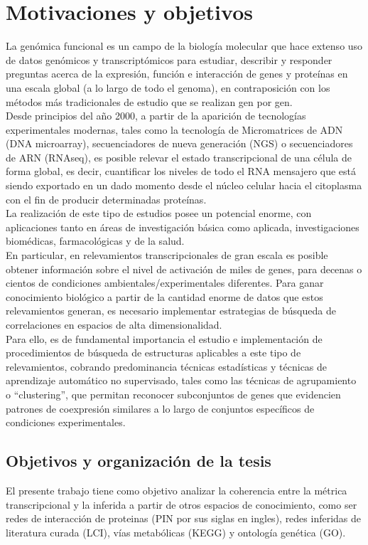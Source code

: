 \chapter*{Motivaciones y objetivos}
La genómica funcional es un campo de la biología molecular que hace extenso uso de datos genómicos y transcriptómicos para estudiar, describir y responder preguntas acerca de la expresión, función e interacción de genes y proteínas en una escala global (a lo largo de todo el genoma), en contraposición con los métodos más tradicionales de estudio que se realizan gen por gen.\\
Desde principios del año 2000, a partir de la aparición de tecnologías experimentales modernas, tales como la tecnología de Micromatrices de ADN (DNA microarray), secuenciadores de nueva generación (NGS) o secuenciadores de ARN (RNAseq), es posible relevar el estado transcripcional de una célula de forma global, es decir, cuantificar los niveles de todo el RNA mensajero que está siendo exportado en un dado momento desde el núcleo celular hacia el citoplasma con el fin de producir determinadas proteínas.\\
La realización de este tipo de estudios posee un potencial enorme, con aplicaciones tanto en áreas de investigación básica como aplicada, investigaciones biomédicas, farmacológicas y de la salud.\\
En particular, en relevamientos transcripcionales de gran escala es posible obtener información sobre el nivel de activación de miles de genes, para decenas o cientos de condiciones ambientales/experimentales diferentes. Para ganar conocimiento biológico a partir de la cantidad enorme de datos que estos relevamientos generan, es necesario implementar estrategias de búsqueda de correlaciones en espacios de alta dimensionalidad.\\
Para ello, es de fundamental importancia el estudio e implementación de procedimientos de búsqueda de estructuras aplicables a este tipo de relevamientos, cobrando predominancia técnicas estadísticas y técnicas de aprendizaje automático no supervisado, tales como las técnicas de agrupamiento o ``clustering'', que permitan reconocer subconjuntos de genes que evidencien patrones de coexpresión similares a lo largo de conjuntos específicos de condiciones experimentales.\cite{functional_genomics_definition_nature, functional_genomics_definition_wikipedia}

\section*{Objetivos y organización de la tesis}
El presente trabajo tiene como objetivo analizar la coherencia entre la métrica transcripcional y la inferida a partir de otros espacios de conocimiento, como ser redes de interacción de proteinas (PIN por sus siglas en ingles), redes inferidas de literatura curada (LCI), vías metabólicas (KEGG) y ontología genética (GO).

